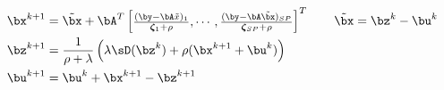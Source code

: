 \documentclass[11pt]{article}
\newcommand\bzeta{\ensuremath{\boldsymbol{\zeta}}}
\begin{document}
\begin{align} 
    \bx^{k+1}
        &= \tilde{\bx} + \bA^T \begin{bmatrix}
            \frac{(\by - \bA\tilde{x})_1}{\bzeta_1 + \rho},\cdots, \frac{(\by - \bA\tilde{\bx})_{SP}}{\bzeta_{SP} + \rho}
        \end{bmatrix}^T
        \qquad \tilde{\bx} = \bz^k - \bu^k \\
    \bz^{k+1}
        &= \frac{1}{\rho + \lambda} \left(
            \lambda \sD(\bz^{k}) + \rho ( \bx^{k+1} + \bu^k  )
        \right) \\
    \bu^{k+1}
        &= \bu^k + \bx^{k+1} - \bz^{k+1}
    \label{eq:red_admm_update_equations_fast_x_update}
\end{align}


\end{document}
